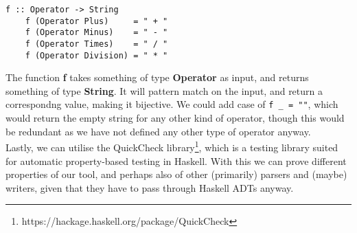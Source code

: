 \begin{lstlisting}[caption={Haskell example to convert data type to string}, captionpos=b]
    f :: Operator -> String
    f (Operator Plus)     = " + "
    f (Operator Minus)    = " - "
    f (Operator Times)    = " / "
    f (Operator Division) = " * "
\end{lstlisting}

The function \textbf{f} takes something of type \textbf{Operator} as input, and returns something of type \textbf{String}. It will pattern match on the input, and return a correspondng value, making it bijective. We could add case of \texttt{f \_ = ""}, which would return the empty string for any other kind of operator, though this would be redundant as we have not defined any other type of operator anyway. \hfill \\

Lastly, we can utilise the QuickCheck library\footnote{https://hackage.haskell.org/package/QuickCheck}, which is a testing library suited for automatic property-based testing in Haskell. With this we can prove different properties of our tool, and perhaps also of other (primarily) parsers and (maybe) writers, given that they have to pass through Haskell ADTs anyway.